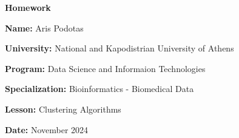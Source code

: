 \documentclass[12pt, a4paper]{article}
\begin{document}
\begin{titlepage}
    \centering
    {\huge \textbf{Homework}\par}
    \vspace{0.5cm}
    {\Large \textbf{Name:} Aris Podotas\par}
    \vspace{0.5cm}
    {\large \textbf{University:} National and Kapodistrian University of Athens\par}
    \vspace{0.5cm}
    {\large \textbf{Program:} Data Science and Informaion Technologies\par}
    \vspace{0.5cm}
    {\large \textbf{Specialization:} Bioinformatics - Biomedical Data\par}
    \vspace{0.5cm}
    {\large \textbf{Lesson:} Clustering Algorithms \par}
    \vspace{0.5cm}
    {\large \textbf{Date:} November 2024\par}
    \tableofcontents
\end{titlepage}
\end{document}
